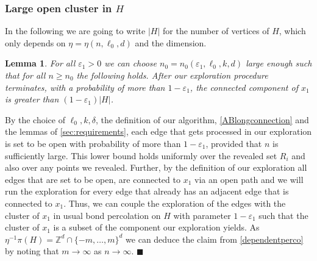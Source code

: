 \documentclass[11pt]{article}%
\newenvironment{proof}{\vspace{1ex}\noindent{\bf Proof.}}{\hspace*{\fill}$\blacksquare$\vspace{1ex}}
\newtheorem{lemma}[lemma]{Lemma}
\newcommand{\eps}{\varepsilon}
\newcommand{\ZZ}{\mathbb{Z}}
\begin{document}
\subsubsection{Large open cluster in $H$}
In the following we are going to write $ |H| $ for the number of vertices of $ H $, which only depends on $ \eta=\eta(n,\ell_0,d) $ and the dimension.
\begin{lemma}\label{largecluster}
	For all $ \eps_1>0 $ we can choose $ n_0=n_0(\eps_1,\ell_0,k,d) $ large enough such that for all $ n\geq n_0 $ the following holds. After our exploration procedure terminates, with a probability of more than $ 1-\eps_1 $, the connected component of $ x_1 $ is greater than $ (1-\eps_1)|H| $.
\end{lemma}	
\begin{proof}
By the choice of $ \ell_0,k,\delta $, the definition of our algorithm, \cref{ABlongconnection} and the lemmas of \cref{sec:requirements}, each edge that gets processed in our exploration is set to be open with probability of more than $ 1-\eps_1 $, provided that $n$ is sufficiently large. This lower bound holds uniformly over the revealed set $ R_i $ and also over any points we revealed. Further, by the definition of our exploration all edges that are set to be open, are connected to $ x_1 $ via an open path and we will run the exploration for every edge that already has an adjacent edge that is connected to $ x_1 $. Thus, we can couple the exploration of the edges with the cluster of $ x_1 $ in usual bond percolation on $ H $ with parameter $ 1-\eps_1 $ such that the cluster of $ x_1 $ is a subset of the component our exploration yields. As $ \eta^{-1}\pi(H) = \ZZ^d\cap\{-m,\dots,m\}^d $ we can deduce the claim from \cref{dependentperco} by noting that $m\to \infty$ as $n\to\infty$.
\end{proof}
\end{document}
